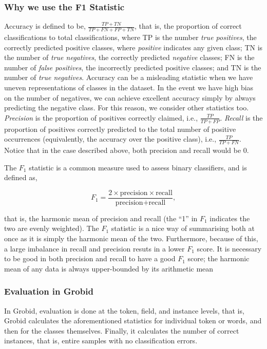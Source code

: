 \documentclass[11pt, oneside]{scrartcl}   	%
\begin{document}
\subsubsection{Why we use the F1 Statistic}

 Accuracy is defined to be, $ \frac{TP + TN}{TP + FN + FP + TN}$, that is, the proportion of correct classifications to total classifications, where TP is the number \emph{true positives}, the correctly predicted positive classes, where \emph{positive} indicates any given class; TN is the number of \emph{true negatives}, the correctly predicted \emph{negative} classes; FN is the number of \emph{false positives}, the incorrectly predicted positive classes; and TN is the number of \emph{true negatives}. Accuracy can be a misleading statistic when we have uneven representations of classes in the dataset. In the event we have high bias on the number of negatives, we can achieve excellent accuracy simply by always predicting the negative class. For this reason, we consider other statistics too. \emph{Precision} is the proportion of positives correctly claimed, i.e., $\frac{TP}{TP + FP}$. \emph{Recall} is the proportion of positives correctly predicted to the total number of positive occurrences (equivalently, the accuracy over the positive class), i.e., $\frac{TP}{TP + FN}$. Notice that in the case described above, both precision and recall would be 0.

The $F_1$ statistic is a common measure used to assess binary classifiers, and is defined as,

$$F_1 = \frac{2 \times \text{precision} \times \text{recall}}{\text{precision} + \text{recall}},$$

that is, the harmonic mean of precision and recall (the ``1'' in $F_1$ indicates the two are evenly weighted). The $F_1$ statistic is a nice way of summarising both at once as it is simply the harmonic mean of the two. Furthermore, because of this, a large imbalance in recall and precision resuts in a lower $F_1$ score. It is necessary to be good in both precision and recall to have a good $F_1$ score; the harmonic mean of any data is always upper-bounded by its arithmetic mean

\subsubsection{Evaluation in Grobid}

In Grobid, evaluation is done at the token, field, and instance levels, that is, Grobid calculates the aforementioned statistics for individual token or words, and then for the classes themselves. Finally, it calculates the number of correct instances, that is, entire samples with no classification errors.
\end{document}
